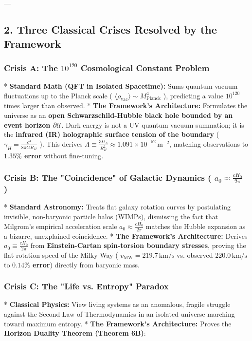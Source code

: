 \documentclass[11pt,a4paper]{article}
\theoremstyle{definition}
\theoremstyle{remark}
\begin{document}
---

\subsection{2. Three Classical Crises Resolved by the Framework}

\subsubsection{Crisis A: The $10^{120}$ Cosmological Constant Problem}
* \textbf{Standard Math (QFT in Isolated Spacetime):} Sums quantum vacuum fluctuations up to the Planck scale ( $\langle \rho_{\text{vac}} \rangle \sim M_{\text{Planck}}^4$ ), predicting a value $10^{120}$ times larger than observed.
* \textbf{The Framework's Architecture:} Formulates the universe as an \textbf{open Schwarzschild-Hubble black hole bounded by an event horizon $\partial\mathcal{U}$}. Dark energy is not a UV quantum vacuum summation; it is the \textbf{infrared (IR) holographic surface tension of the boundary} ( $\gamma_H = \frac{c^4}{8\pi G R_H}$ ).
This derives $\Lambda \equiv \frac{3\Omega_\Lambda}{R_H^2} \approx 1.091 \times 10^{-52} \, \mathrm{m^{-2}}$, matching observations to \textbf{$1.35\%$ error} without fine-tuning.

\subsubsection{Crisis B: The "Coincidence" of Galactic Dynamics ( $a_0 \approx \frac{c H_0}{2\pi}$ )}
* \textbf{Standard Astronomy:} Treats flat galaxy rotation curves by postulating invisible, non-baryonic particle halos (WIMPs), dismissing the fact that Milgrom's empirical acceleration scale $a_0 \approx \frac{c H_0}{2\pi}$ matches the Hubble expansion as a bizarre, unexplained coincidence.
* \textbf{The Framework's Architecture:} Derives $a_0 \equiv \frac{c H_0}{2\pi}$ from \textbf{Einstein-Cartan spin-torsion boundary stresses}, proving the flat rotation speed of the Milky Way ( $v_{\text{MW}} = 219.7 \, \mathrm{km/s}$ vs. observed $220.0 \, \mathrm{km/s}$ to \textbf{$0.14\%$ error}) directly from baryonic mass.

\subsubsection{Crisis C: The "Life vs. Entropy" Paradox}
* \textbf{Classical Physics:} View living systems as an anomalous, fragile struggle against the Second Law of Thermodynamics in an isolated universe marching toward maximum entropy.
* \textbf{The Framework's Architecture:} Proves the \textbf{Horizon Duality Theorem (Theorem 6B)}:
\end{document}
